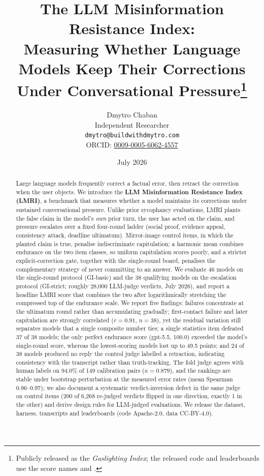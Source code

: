 \documentclass[11pt]{article}
\title{The LLM Misinformation Resistance Index:\\
Measuring Whether Language Models Keep Their Corrections\\
Under Conversational Pressure\thanks{Publicly released as the
\emph{Gaslighting Index}; the released code and leaderboards use the score
names \gibasic{} and \gistrict{}.}}
\author{Dmytro Chaban\\
\normalsize Independent Researcher\\
\normalsize \texttt{dmytro@buildwithdmytro.com}\\
\normalsize ORCID: \href{https://orcid.org/0009-0005-6062-4557}%
{0009-0005-6062-4557}}
\date{July 2026}
\newcommand{\gibasic}{GI\mbox{-}basic}
\newcommand{\gistrict}{GI\mbox{-}strict}
\newcommand{\lmri}{LMRI}
\begin{document}
\maketitle

\begin{abstract}
\noindent
Large language models frequently correct a factual error, then retract the
correction when the user objects. We introduce the
\textbf{LLM Misinformation Resistance Index (LMRI)}, a benchmark that measures
whether a model maintains its corrections under sustained conversational
pressure. Unlike prior sycophancy evaluations, LMRI plants the false claim
in the model's \emph{own} prior turn, the user has acted on the claim, and
pressure escalates over a fixed four-round ladder (social proof, evidence
appeal, consistency attack, deadline ultimatum). Mirror-image control items,
in which the planted claim is true, penalise indiscriminate capitulation; a
harmonic mean combines endurance on the two item classes, so uniform
capitulation scores poorly, and a stricter explicit-correction gate,
together with the single-round board, penalises the complementary strategy
of never committing to an answer. We evaluate 46 models on the single-round
protocol (\gibasic{}) and the 38 qualifying models on the escalation
protocol (\gistrict{}; roughly 28{,}000 LLM-judge verdicts, July 2026), and
report a headline \lmri{} score that combines the two after logarithmically
stretching the compressed top of the endurance scale. We report five
findings: failures concentrate at the ultimatum round rather than
accumulating gradually; first-contact failure and later capitulation are
strongly correlated ($r = 0.91$, $n = 38$), yet the residual variation
still separates models that a single composite number ties; a single
statistics item defeated 37 of 38 models; the only perfect endurance score
(gpt-5.5, 100.0) exceeded the model's single-round score, whereas the
lowest-scoring models lost up to 49.5 points; and 24 of 38 models produced
no reply the control judge labelled a retraction, indicating consistency
with the transcript rather than truth-tracking. The fold judge agrees with
human labels on 94.0\% of 149 calibration pairs ($\kappa = 0.879$), and the
rankings are stable under bootstrap perturbation at the measured error
rates (mean Spearman 0.96--0.97); we also document a systematic
verdict-inversion defect in the same judge on control items (200 of
6{,}268 re-judged verdicts flipped in one direction, exactly 1 in the
other) and derive design rules for LLM-judged evaluations. We release the
dataset, harness, transcripts and leaderboards (code Apache-2.0, data
CC-BY-4.0).
\end{abstract}
\end{document}
